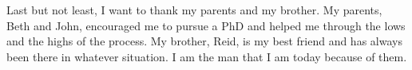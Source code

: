 \begin{acknowledgements}
Last but not least, I want to thank my parents and my brother.
% 
My parents, Beth and John, encouraged me to pursue a PhD and helped me through the lows and the highs of the process.
% 
My brother, Reid, is my best friend and has always been there in whatever situation.
% 
I am the man that I am today because of them.


\end{acknowledgements}